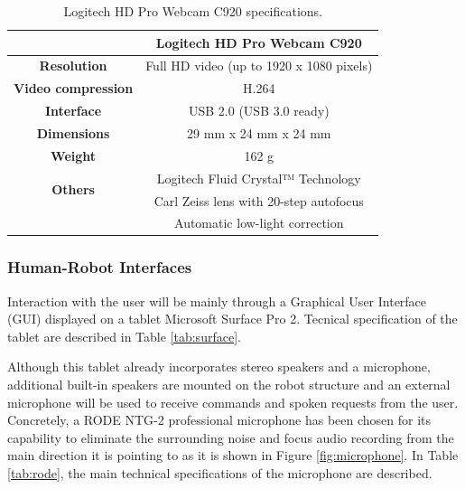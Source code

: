 \begin{table}[h!]
\begin{center}
\begin{tabular}{|c|c|}
\hline
& \bf{Logitech HD Pro Webcam C920} \\
\hline \bf{Resolution } & Full HD video (up to 1920 x 1080 pixels) \\
\hline \bf{Video compression } & H.264 \\ 
\hline \bf{Interface } & USB 2.0 (USB 3.0 ready) \\
\hline \bf{Dimensions } & 29 mm x 24 mm x 24 mm \\ 
\hline \bf{Weight } & 162 g \\
\hline \multirow{2}{*}{\bf{Others}}
& Logitech Fluid Crystal™ Technology \\
& Carl Zeiss lens with 20-step autofocus \\
& Automatic low-light correction \\
\hline
\end{tabular}
\end{center}
\caption{Logitech HD Pro Webcam C920 specifications.}
\label{tab:logitech}
\end{table}

\subsubsection{Human-Robot Interfaces}
Interaction with the user will be mainly through a Graphical User
Interface (GUI) displayed on a tablet Microsoft Surface Pro 2.
Tecnical specification of the tablet are described in Table \ref{tab:surface}.

Although this tablet already incorporates stereo speakers and a
microphone, additional built-in speakers are mounted on the robot
structure and an external microphone will be used to receive commands
and spoken requests from the user. Concretely, a RODE NTG-2
professional microphone has been chosen for its capability to
eliminate the surrounding noise and focus audio recording from the main direction it is pointing to as it is shown in Figure \ref{fig:microphone}.
In Table \ref{tab:rode}, the main technical specifications of the microphone are described.

